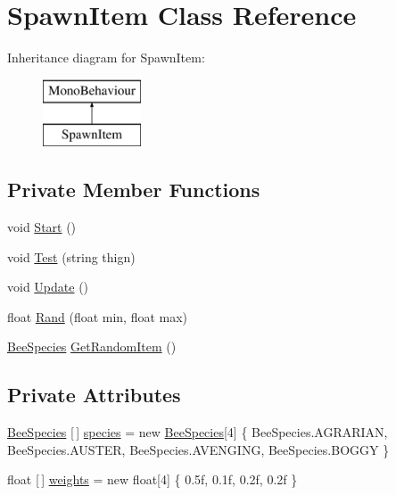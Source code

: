 \hypertarget{class_spawn_item}{}\section{Spawn\+Item Class Reference}
\label{class_spawn_item}
Inheritance diagram for Spawn\+Item\+:\begin{figure}[H]
\begin{center}
\leavevmode
\includegraphics[height=2.000000cm]{class_spawn_item}
\end{center}
\end{figure}
\subsection*{Private Member Functions}
\begin{DoxyCompactItemize}
\item 
void \hyperlink{class_spawn_item_abce0af54142e123b9c4aae4fd6f4656c}{Start} ()
\item 
void \hyperlink{class_spawn_item_a0bcf186dd80f62583686eb240f2107ca}{Test} (string thign)
\item 
void \hyperlink{class_spawn_item_a51a14837f0e601a8487541d8ec502db9}{Update} ()
\item 
float \hyperlink{class_spawn_item_ac77536d30b5e96d90b03ea4b4ee5c2a8}{Rand} (float min, float max)
\item 
\hyperlink{namespace_bee_game_1_1_enums_aa2ead984825678d83c42d48f6382619c}{Bee\+Species} \hyperlink{class_spawn_item_af8aa1bfe3ed53c05d673dd46b26bc97e}{Get\+Random\+Item} ()
\end{DoxyCompactItemize}
\subsection*{Private Attributes}
\begin{DoxyCompactItemize}
\item 
\hyperlink{namespace_bee_game_1_1_enums_aa2ead984825678d83c42d48f6382619c}{Bee\+Species} \mbox{[}$\,$\mbox{]} \hyperlink{class_spawn_item_a0af51e744d43adcc6a295222b5d70a6e}{species} = new \hyperlink{namespace_bee_game_1_1_enums_aa2ead984825678d83c42d48f6382619c}{Bee\+Species}\mbox{[}4\mbox{]} \{ Bee\+Species.\+A\+G\+R\+A\+R\+I\+AN, Bee\+Species.\+A\+U\+S\+T\+ER, Bee\+Species.\+A\+V\+E\+N\+G\+I\+NG, Bee\+Species.\+B\+O\+G\+GY \}
\item 
float \mbox{[}$\,$\mbox{]} \hyperlink{class_spawn_item_a52966f3825c8c50f79c0a9a1ba300b52}{weights} = new float\mbox{[}4\mbox{]} \{ 0.\+5f, 0.\+1f, 0.\+2f, 0.\+2f \}
\end{DoxyCompactItemize}


